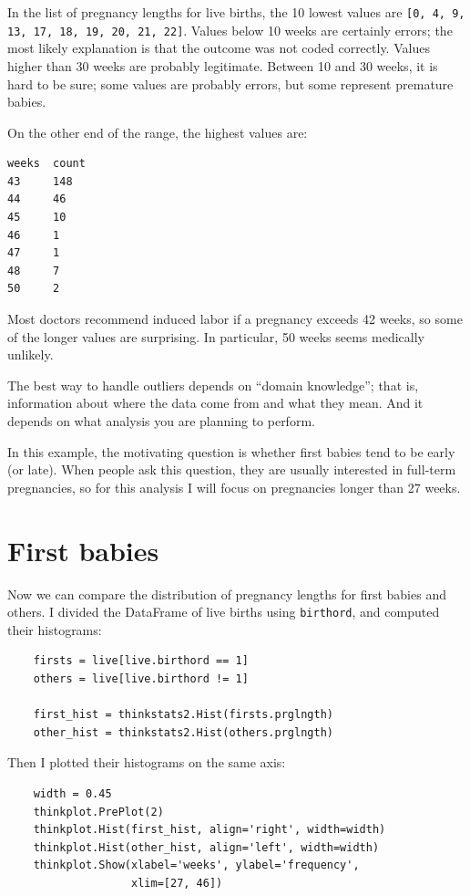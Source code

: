 \documentclass[12pt]{book}
\begin{document}
In the list of pregnancy lengths for live births, the 10 lowest values
are {\tt [0, 4, 9, 13, 17, 18, 19, 20, 21, 22]}.  Values below 10 weeks
are certainly errors; the most likely explanation is that the outcome
was not coded correctly.  Values higher than 30 weeks are probably
legitimate.  Between 10 and 30 weeks, it is hard to be sure; some
values are probably errors, but some represent premature babies.

On the other end of the range, the highest values are:
%
\begin{verbatim}
weeks  count
43     148
44     46
45     10
46     1
47     1
48     7
50     2
\end{verbatim}

Most doctors recommend induced labor if a pregnancy exceeds 42 weeks,
so some of the longer values are surprising.  In particular, 50 weeks
seems medically unlikely.

The best way to handle outliers depends on ``domain knowledge'';
that is, information about where the data come from and what they
mean.  And it depends on what analysis you are planning to perform.

In this example, the motivating question is whether first babies
tend to be early (or late).  When people ask this question, they are
usually interested in full-term pregnancies, so for this analysis
I will focus on pregnancies longer than 27 weeks.


\section{First babies}

Now we can compare the distribution of pregnancy lengths for first
babies and others.  I divided the DataFrame of live births using
{\tt birthord}, and computed their histograms:

\begin{verbatim}
    firsts = live[live.birthord == 1]
    others = live[live.birthord != 1]

    first_hist = thinkstats2.Hist(firsts.prglngth)
    other_hist = thinkstats2.Hist(others.prglngth)
\end{verbatim}

Then I plotted their histograms on the same axis:

\begin{verbatim}
    width = 0.45
    thinkplot.PrePlot(2)
    thinkplot.Hist(first_hist, align='right', width=width)
    thinkplot.Hist(other_hist, align='left', width=width)
    thinkplot.Show(xlabel='weeks', ylabel='frequency',
                   xlim=[27, 46])
\end{verbatim}
\end{document}
